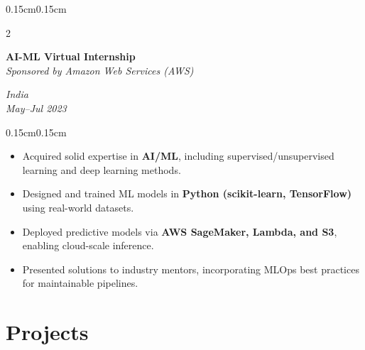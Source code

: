 \documentclass[10pt, letterpaper]{article}
\newenvironment{highlights}{
\begin{itemize}[leftmargin=0.35cm, itemsep=1pt, topsep=1pt, parsep=0pt]
}{
\end{itemize}
}
\newenvironment{onecolentry}{
\begin{adjustwidth}{0.15cm}{0.15cm}
}{
\end{adjustwidth}
}
\newenvironment{twocolentry}[2][]{
\onecolentry
\def\secondColumn{#2}
\setcolumnwidth{\fill,4.2cm}
\begin{paracol}{2}
}{
\switchcolumn \raggedleft \secondColumn
\end{paracol}
\endonecolentry
}
\begin{document}
\vspace{0.2 cm}

\begin{twocolentry}{\textit{India}\\\textit{May--Jul 2023}}
\textbf{AI-ML Virtual Internship} \\
\textit{Sponsored by Amazon Web Services (AWS)}
\end{twocolentry}
\begin{onecolentry}
\begin{highlights}
\item Acquired solid expertise in \textbf{AI/ML}, including supervised/unsupervised learning and deep learning methods.  
\item Designed and trained ML models in \textbf{Python (scikit-learn, TensorFlow)} using real-world datasets.  
\item Deployed predictive models via \textbf{AWS SageMaker, Lambda, and S3}, enabling cloud-scale inference.  
\item Presented solutions to industry mentors, incorporating MLOps best practices for maintainable pipelines.  
\end{highlights}
\end{onecolentry}



\section{Projects}
\end{document}
